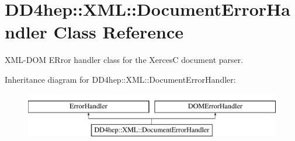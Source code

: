 \hypertarget{class_d_d4hep_1_1_x_m_l_1_1_document_error_handler}{}\section{D\+D4hep\+:\+:X\+ML\+:\+:Document\+Error\+Handler Class Reference}
\label{class_d_d4hep_1_1_x_m_l_1_1_document_error_handler}


X\+M\+L-\/\+D\+OM E\+Rror handler class for the XercesC document parser.  


Inheritance diagram for D\+D4hep\+:\+:X\+ML\+:\+:Document\+Error\+Handler\+:\begin{figure}[H]
\begin{center}
\leavevmode
\includegraphics[height=2.000000cm]{class_d_d4hep_1_1_x_m_l_1_1_document_error_handler}
\end{center}
\end{figure}
